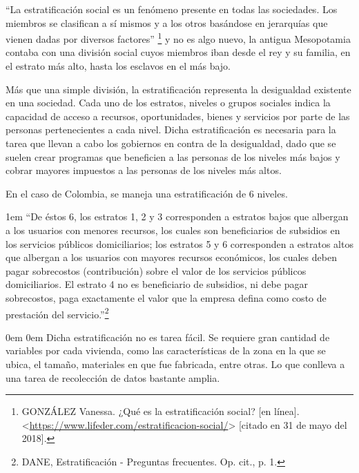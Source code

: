     “La estratificación social es un fenómeno presente en todas las sociedades. Los miembros se clasifican a sí mismos y a los otros basándose en jerarquías que vienen dadas por diversos factores”
    \footnote[8]{GONZÁLEZ Vanessa. ¿Qué es la estratificación social? [en línea]. <\url{https://www.lifeder.com/estratificacion-social/}> [citado en 31 de mayo del 2018].} y no es algo nuevo, la antigua Mesopotamia contaba con una división social cuyos miembros iban desde el rey y su familia, en el estrato más alto, hasta los esclavos en el más bajo.
    
    Más que una simple división, la estratificación representa la desigualdad existente en una sociedad. Cada uno de los estratos, niveles o grupos sociales indica la capacidad de acceso a recursos, oportunidades, bienes y servicios por parte de las personas pertenecientes a cada nivel. Dicha estratificación es necesaria para la tarea que llevan a cabo los gobiernos en contra de la desigualdad, dado que se suelen crear programas que beneficien a las personas de los niveles más bajos y cobrar mayores impuestos a las personas de los niveles más altos.
    
    En el caso de Colombia, se maneja una estratificación de 6 niveles.

	\leftskip1em
	\rightskip\leftskip
	{\footnotesize \hspace{\parindent} “De éstos 6, los estratos 1, 2 y 3 corresponden a estratos bajos que albergan a los usuarios con menores recursos, los cuales son beneficiarios de subsidios en los servicios públicos domiciliarios; los estratos 5 y 6 corresponden a estratos altos que albergan a los usuarios con mayores recursos económicos, los cuales deben pagar sobrecostos (contribución) sobre el valor de los servicios públicos domiciliarios. El estrato 4 no es beneficiario de subsidios, ni debe pagar sobrecostos, paga exactamente el valor que la empresa defina como costo de prestación del servicio.”\footnote[9]{DANE, Estratificación - Preguntas frecuentes. Op. cit., p. 1.}}
	
	\leftskip0em
	\rightskip0em
    Dicha estratificación no es tarea fácil. Se requiere gran cantidad de variables por cada vivienda, como las características de la zona en la que se ubica, el tamaño, materiales en que fue fabricada, entre otras. Lo que conlleva a una tarea de recolección de datos bastante amplia.
    
    
